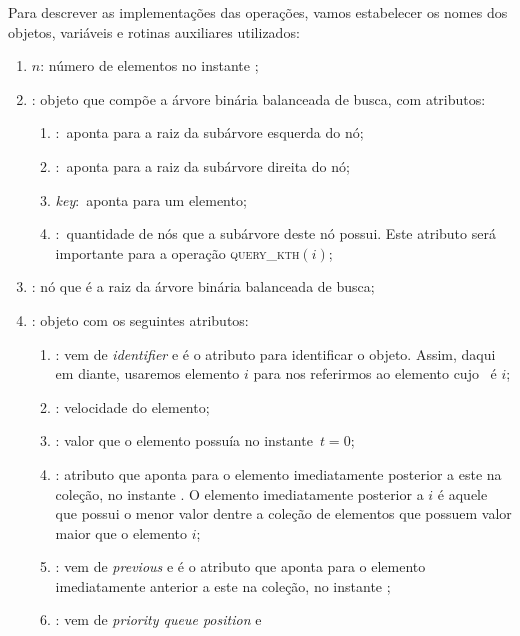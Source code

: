 Para descrever as implementações das operações, vamos
estabelecer os nomes dos objetos, variáveis e rotinas
auxiliares utilizados:
\begin{enumerate}
    \item $n$: número de elementos no instante \now;
    \item \no: objeto que compõe a árvore binária balanceada
            de busca, com atributos:
    \begin{enumerate}
        \item \esq$:$ aponta para a raiz da subárvore
                    esquerda do nó;
        \item \dir$:$ aponta para a raiz da subárvore
                    direita do nó;
        \item \textit{key}$:$ aponta para um elemento;
        \item \children$:$ quantidade de nós que a subárvore
                            deste nó possui.
                        Este atributo será importante para a
                        operação \textsc{query\_kth}$(i)$;
    \end{enumerate}
    \item \raiz: nó que é a raiz da árvore binária balanceada de
                busca;
    \item \elemento: objeto com os seguintes atributos:
    \begin{enumerate}
        \item \id: vem de \textit{identifier} e é o atributo
                    para identificar o objeto. Assim, daqui
                    em diante, usaremos elemento $i$ para nos
                    referirmos ao elemento cujo \id~é $i$;
        \item \speed: velocidade do elemento;
        \item \initv: valor que o elemento possuía no
        instante~$t = 0$;
        \item \nex: atributo que aponta para o elemento
                    imediatamente posterior a este na coleção,
                    no instante \now. O elemento imediatamente
                    posterior a $i$ é aquele que possui o menor
                    valor dentre a coleção de elementos que
                    possuem valor maior que o elemento $i$;
        \item \prev: vem de \textit{previous} e é o atributo
                    que aponta para o elemento imediatamente anterior
                    a este na coleção, no instante \now;
        \item \pqpos: vem de \textit{priority queue position} e

\end{enumerate}
\end{enumerate}
